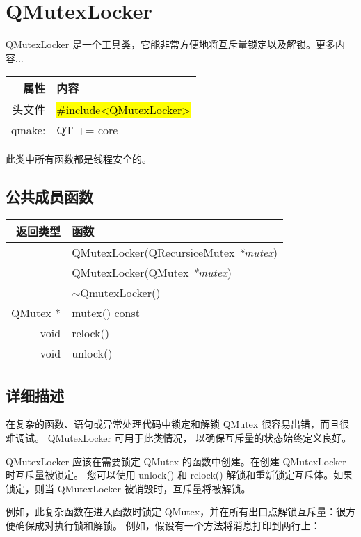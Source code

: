 \chapter{QMutexLocker}

QMutexLocker 是一个工具类，它能非常方便地将互斥量锁定以及解锁。更多内容...

\begin{tabular}{|r|l|}
	\hline
	属性 & 内容 \\
	\hline
    头文件  &	\hl{\#include<QMutexLocker>} \\
    \hline
    qmake: & QT += core    \\
	\hline
\end{tabular}

\begin{compactitem}
\item 此类中所有函数都是线程安全的。
\end{compactitem}

\section{公共成员函数}

\begin{tabular}{|r|l|}   
    \hline
    返回类型 	& 函数 \\
    \hline
    & QMutexLocker(QRecursiceMutex \emph{*mutex}) \\ 
    \hline
	&QMutexLocker(QMutex \emph{*mutex}) \\ 
    \hline
	& $\sim$QmutexLocker() \\ 
\hline
QMutex * &	mutex() const \\
\hline
void 	& relock()\\
\hline
void 	& unlock() \\ 
    \hline 
\end{tabular}


\section{详细描述}

在复杂的函数、语句或异常处理代码中锁定和解锁 QMutex 很容易出错，而且很难调试。
QMutexLocker 可用于此类情况，
以确保互斥量的状态始终定义良好。

QMutexLocker 应该在需要锁定 QMutex 的函数中创建。在创建 QMutexLocker 时互斥量被锁定。
您可以使用 unlock() 和 relock() 解锁和重新锁定互斥体。如果锁定，则当 QMutexLocker 被销毁时，互斥量将被解锁。

例如，此复杂函数在进入函数时锁定 QMutex，并在所有出口点解锁互斥量：很方便确保成对执行锁和解锁。
例如，假设有一个方法将消息打印到两行上：

